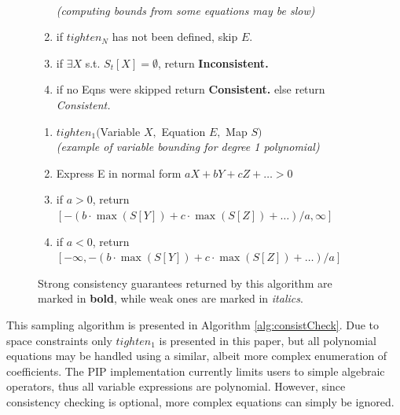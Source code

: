 \begin{figure}
\begin{algorithm}
\begin{enumerate}
\\    \hspace*{0.5in} \textit{(computing bounds from some equations may be slow)}
\item \hspace*{0.5in} if $tighten_N$ has not been defined, skip $E$.
\item \hspace*{0.3in} if $\exists X$ s.t. $S_{t}[X] = \emptyset$, return \textbf{Inconsistent.}
\item \hspace*{0.1in} if no Eqns were skipped return \textbf{Consistent.} else return \textit{Consistent.}
\end{enumerate}
\begin{enumerate}
\item $tighten_1($Variable $X,$ Equation $E,$ Map $S)$
\\    \hspace*{0.1in} \textit{(example of variable bounding for degree 1 polynomial)}
\item \hspace*{0.1in} Express E in normal form $aX + bY + cZ + \ldots > 0$
\item \hspace*{0.2in} if $a > 0$, return $[-(b\cdot \max(S[Y]) + c\cdot \max(S[Z])+\ldots)/a, \infty]$
\item \hspace*{0.2in} if $a < 0$, return $[-\infty, -(b\cdot \max(S[Y]) + c\cdot \max(S[Z])+\ldots)/a]$
\end{enumerate}
\end{algorithm}
{\footnotesize Strong consistency guarantees returned by this algorithm are marked in \textbf{bold}, while weak ones are marked in \textit{italics}.}
\vspace*{-0.2in}
\end{figure}

This sampling algorithm is presented in Algorithm \ref{alg:consistCheck}.  Due to space constraints only $tighten_1$ is presented in this paper, but all polynomial equations may be handled using a similar, albeit more complex enumeration of coefficients.  The PIP implementation currently limits users to simple algebraic operators, thus all variable expressions are polynomial.  However, since consistency checking is optional, more complex equations can simply be ignored.


